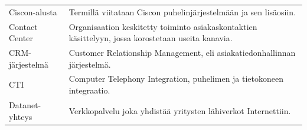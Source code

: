 \documentclass[finnish,12pt,a4paper,pdftex]{article}
\begin{document}
\begin{table}[h!]
\begin{tabular}{ p{5cm}  p{\textwidth-6cm} }
Ciscon-alusta               & Termillä viitataan Ciscon puhelinjärjestelmään ja sen lisäosiin.                                                                                 \\[0.9em]
Contact Center              & Organisaation keskitetty toiminto asiakaskontaktien käsittelyyn, jossa korostetaan useita kanavia.                                               \\[0.9em]
CRM-järjestelmä             & Customer Relationship Management, eli asiakatiedonhallinnan järjestelmä.                                                                          \\[0.9em]
CTI                         & Computer Telephony Integration, puhelimen ja tietokoneen integraatio.                                                                             \\[0.9em]
Datanet- yhteys             & Verkkopalvelu joka yhdistää yritysten lähiverkot Internettiin.                                                                                   \\[0.9em]

\end{tabular}
\end{table}
\end{document}

